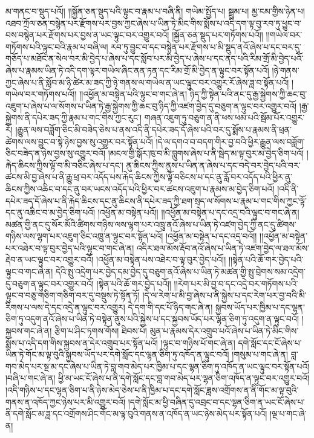མ་གནང་བ་སྡུད་པའོ།། །།སྐྱོན་ཅན་སྡུད་པའི་ལྟུང་བ་རྣམ་པ་བཞི་ནི། གཡེམ་སྤྱོད་པ། སྦྲུམ་པ། མྱ་ངམ་གྱིས་ཉེན་པ། འཐབ་ཀྲོལ་ཅན་བསྙེན་པར་རྫོགས་པར་བྱས་ཀྱང་ཞེས་པ་ཡིན་ཏེ་མིང་གིས་སྨོས་པ་འདི་དག་ལྟ་བུ་རབ་ཏུ་ཕྱུང་བ་བས་བསྙེན་པར་རྫོགས་པར་བྱས་ན་ཡང་ལྟུང་བར་འགྱུར་བའོ། །སྐྱོན་ཅན་སྡུད་པར་གཏོགས་པའོ།། །།གཡེལ་བར་གཏོགས་པའི་ལྟུང་བའི་རྣམ་པ་བཞི་ལ། རབ་ཏུ་བྱུང་བ་དང་བསྙེན་པར་རྫོགས་པ་མི་སྡུད་ནའོ་ཞེས་པ་དང་བར་དུ་གཅོད་པ་མཐོང་ན་སེལ་བར་མི་བྱེད་པ་ཞེས་པ་དང་སློབ་པར་མི་བྱེད་པ་ཞེས་པ་དང་ནད་པའི་རིམ་གྲོ་མི་བྱེད་པའོ་ཞེས་པ་རྣམས་ཡིན་ཏེ་འདི་དག་ལྟར་གཡེལ་ཞིང་ནན་ཏན་དང་རིམ་གྲོ་མི་བྱེད་ན་ལྟུང་བར་སྟོན་པའོ། །ཉེ་གནས་ཀྱང་ཞེས་པ་ནི་སློབ་མ་ཉི་ཚེར་མ་ཟད་ཀྱི་ཉེ་གནས་ལ་གཡེལ་ན་ཡང་ལྟུང་བར་འགྱུར་རོ་ཞེས་ཟླ་བ་སྟོན་པའོ། །གཡེལ་བར་གཏོགས་པའོ།། །།འཕྱོན་མ་བསྟེན་པའི་ལྟུང་བ་གང་ཞེ་ན། ཉིད་ཀྱི་སྟེན་པའི་ནང་དུ་རྒྱ་སྐྱེགས་ཀྱི་ཆང་བུ་འཇུག་པ་ཞེས་པ་ལ་སོགས་པ་ཡིན་ཏེ་རྒྱ་སྐྱེགས་ཀྱི་ཆང་བུ་ཉིད་ཀྱི་འཛག་བྱེད་དུ་བཅུག་ན་ལྟུང་བར་འགྱུར་བའོ། །རྒྱ་སྐྱེགས་ནི་དཔེར་ཟད་ཀྱི་རྣམ་པ་གང་གིས་ཀྱང་རུང་། གཞན་འཇུག་ཏུ་བཅུག་ན་ནི་ཕས་ཕམ་པའི་སྦོམ་པོར་འགྱུར་རོ། །རྒྱུན་ལས་བཟློག་ཅིང་མི་བཟེད་ཅེས་པ་ནས་འདི་ནི་དཔེར་ཟད་དོ་ཞེས་པའི་བར་དུ་སྨོས་པ་རྣམས་ནི་ཕྲན་ཚེགས་ལས་བྱུང་བ་སྟེ་ཉེས་བྱས་སུ་འགྱུར་བར་སྟོན་པའོ། །དེ་ལ་དགའ་བ་བདག་གིར་བྱ་བའི་ཕྱིར་རྒྱུན་ལས་བཟློག་ཅིང་བཟེད་ན་ཉེས་བྱས་སུ་འགྱུར་བའོ། །མངལ་གྱི་སྒོར་ཁུ་བ་མི་བླུགས་ཞེས་པ་ནི་སྦེད་མ་ལྟ་བུར་མ་བྱེད་ཅིག་པའོ། །རྐེད་ཆིངས་ཀྱིས་ལྟོ་བ་མི་བཅིང་ཞེས་པ་དང་། ནུ་ཆིངས་ཀྱིས་ནུས་པ་ཡིན་ན་ཞེས་པ་དང་བདེ་བར་བྱེད་པའི་བར་ཚངས་མི་བྱ་ཞེས་པ་ནི་རྒྱུ་ཕྲ་བར་འདོད་པས་རྐེད་ཆིངས་ཀྱིས་ལྟོ་བཅིངས་པ་དང་ནུ་རློ་བར་འདོད་པའི་ཕྱིར་ནུ་ཆིངས་ཀྱིས་འཆིང་བ་དང་ནུ་བར་ཡངས་འདོད་པའི་ཕྱིར་བར་ཚངས་འཇུག་པ་རྣམས་མ་བྱེད་ཅིག་པའོ། །འདི་ནི་དཔེར་ཟད་དོ་ཞེས་པ་ནི་རྐེད་ཆིངས་དང་ནུ་ཆིངས་ནི་དཔེར་ཟད་ཀྱི་ཐག་སྲད་ལ་སོགས་པ་རྣམ་པ་གང་གིས་ཀྱང་ལྟོ་དང་ནུ་འཆིང་བ་མ་བྱེད་ཅིག་པའོ། །འཕྱོན་མ་བསྟེན་པའོ།། །།འཕྱོན་མ་བསྟེན་པ་དང་འདྲ་བའི་ལྟུང་བ་གང་ཞེ་ན། མཚན་གྱི་ནང་དུ་སོར་མོའི་ཚིགས་གཉིས་ལས་ལྷག་པར་འཁྲུ་ནའོ་ཞེས་པ་ཡིན་ཏེ་འཛག་བྱེད་ཀྱི་ནང་དུ་ཚིགས་གཉིས་ལས་ལྷག་པར་འཇུག་ཅིང་འཁྲུ་ན་ལྟུང་བར་སྟོན་པའོ། །འཕྱོན་མ་བསྟེན་པ་དང་འདྲ་བའོ།། །།འཕྱོན་མ་བསྟེན་པར་འཐེར་བ་ལྟ་བུར་བྱེད་པའི་ལྟུང་བ་གང་ཞེ་ན། འདིར་ཐལ་མོས་རྡོབ་ནའོ་ཞེས་པ་ཡིན་ཏེ་འཛག་བྱེད་ལ་ཐལ་མོས་རྡེབ་ན་ཡང་ལྟུང་བར་འགྱུར་བའོ། །འཕྱོན་མ་བསྟེན་པས་འཐེར་བ་ལྟ་བུར་བྱེད་པའོ།། །།སྟེན་པའི་ཆོ་གར་བྱེད་པའི་ལྟུང་བ་གང་ཞེ་ན། དེའི་སྤུ་འདྲེག་པར་བྱེད་དམ་བྱེད་དུ་བཅུག་ནའོ་ཞེས་པ་ཡིན་ཏེ་མཚན་གྱི་སྤུ་བྲེགས་སམ་འདྲེག་དུ་བཅུག་ན་ལྟུང་བར་འགྱུར་བའོ། །སྟེན་པའི་ཆོ་གར་བྱེད་པའོ།། །།རེག་པར་མི་བྱ་བ་དང་འདྲེ་བར་གཏོགས་པའི་ལྟུང་བ་བཅུ་གཅིག་གཅིག་བར་དུ་བསྡུས་ཏེ་སྟོན་ཏོ། །དེ་ལ་རེག་པ་མི་བྱ་ཞེས་པ་ནི་སྐྱེས་པ་དང་རེག་པར་བྱ་བའི་མི་རིགས་པ་ལས་དེ་དང་འདྲེ་ན་ལྟུང་བར་འགྱུར། དེ་དག་གི་དང་པོ་ཉིད་གང་ཞེ་ན། སྐྱབས་ཡོད་པར་ཁྱིམ་པ་དང་ལྷན་ཅིག་ཏུ་འདུག་ནའོ་ཞེས་པ་ཡིན་ཏེ་བསྟེན་ནུས་པའི་སྐྱེས་པ་དང་སྐྱབས་ཡོད་པར་ལྷན་ཅིག་ཏུ་འདུག་ན་ལྟུང་བའོ། །སྐྱབས་གང་ཞེ་ན། རྩིག་པ་ཤིང་ཏགས་གོས། ཐིབས་པོ། མུན་པ་རྣམས་དེར་འགྲུབ་པའོ་ཞེས་པ་ཡིན་ཏེ་མིང་གིས་སྨོས་པ་འདི་དག་གིས་སྐྱབས་ན་དེར་འགྲུབ་པར་སྟོན་པའོ། །ལྟུང་བ་གཉིས་པོ་གང་ཞེ་ན། དགེ་སློང་དང་ངོ་ཞེས་པ་ཡིན་ཏེ་གོང་མ་ལྟ་བུའི་སྐྱབས་ཡོད་པར་དགེ་སློང་དང་ལྷན་ཅིག་ཏུ་འཁོད་ན་ལྟུང་བའོ། །གསུམ་པ་གང་ཞེ་ན། བླ་གབ་མེད་པར་སྔ་མ་དང་ཞེས་པ་ཡིན་ཏེ་བླ་གབ་མེད་པར་ཁྱིམ་པ་དང་ལྷན་ཅིག་ཏུ་འཁོད་ན་ཡང་ལྟུང་བར་སྟོན་པའོ། །བཞི་པ་གང་ཞེ་ན། ཕྱི་མ་ཡང་ངོ་ཞེས་པ་ནི་དགེ་སློང་དང་བླ་གབ་མེད་པར་ལྷན་ཅིག་འཁོད་ན་ལྟུང་བར་འགྱུར་བའོ། །འདི་གཉིས་པ་དང་ལྷན་ཅིག་པ་ནི་ཉེས་མེད་ཅེས་པ་ནི་ཁྱིམ་པ་དང་དགེ་སློང་ཟླས་འགྲོགས་ན་ནི་གོང་མ་ལྟ་བུའི་གནས་ན་འཁོད་ཀྱང་ཉེས་པར་མི་འགྱུར་བའོ། །དགེ་སློང་མ་ཕྱི་བཞིན་དུ་འབྲང་བ་དང་ལྷན་ཅིག་ན་ཡང་ངོ་ཞེས་པ་ནི་དགེ་སློང་མ་ཟླ་དང་འགྲོགས་ཤིང་གོང་མ་ལྟ་བུའི་གནས་ན་འཁོད་ན་ཡང་ཉེས་མེད་པར་སྟོན་པའོ། །ལྔ་པ་གང་ཞེ་ན། 
